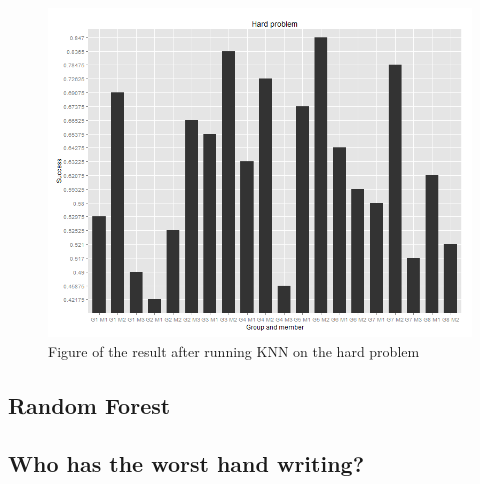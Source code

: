 \documentclass[report]{subfiles}
\begin{document}
\begin{figure}[H]
	\centering
	\includegraphics[width=1\textwidth]{images/knnHardProblem}
	\caption{Figure of the result after running KNN on the hard problem}
	\label{fig:knnHardProblem}
\end{figure}

\subsection{Random Forest}

\subsection{Who has the worst hand writing?}
\end{document}
